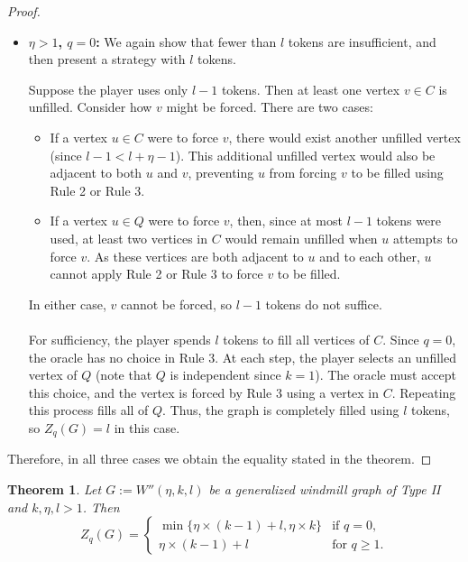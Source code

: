 \documentclass[11pt]{article}
\theoremstyle{plain}
\newtheorem{theorem}{Theorem}[section]
\theoremstyle{definition}
\theoremstyle{remark}
\begin{document}
\begin{proof}
\begin{itemize}
    \item \textbf{$\eta > 1$, $q = 0$:}  
    We again show that fewer than $l$ tokens are insufficient, and then present a strategy with $l$ tokens.  

    Suppose the player uses only $l-1$ tokens. Then at least one vertex $v \in C$ is unfilled. Consider how $v$ might be forced. There are two cases:

    \begin{itemize}
        
        \item If a vertex $u \in C$ were to force $v$, there would exist another unfilled vertex (since $l-1 < l+\eta-1$). This additional unfilled vertex would also be adjacent to both $u$ and $v$, preventing $u$ from forcing $v$ to be filled using Rule 2 or Rule 3.\\  
    
        \item If a vertex $u \in Q$ were to force $v$, then, since at most $l-1$ tokens were used, at least two vertices in $C$ would remain unfilled when $u$ attempts to force $v$. As these vertices are both adjacent to $u$ and to each other, $u$ cannot apply Rule 2 or Rule 3 to force $v$ to be filled.
    \end{itemize}
    In either case, $v$ cannot be forced, so $l-1$ tokens do not suffice.\\\\   
    For sufficiency, the player spends $l$ tokens to fill all vertices of $C$. Since $q=0$, the oracle has no choice in Rule 3. At each step, the player selects an unfilled vertex of $Q$ (note that $Q$ is independent since $k=1$). The oracle must accept this choice, and the vertex is forced by Rule 3 using a vertex in $C$. Repeating this process fills all of $Q$. Thus, the graph is completely filled using $l$ tokens, so $Z_q(G) = l$ in this case.
\end{itemize}

Therefore, in all three cases we obtain the equality stated in the theorem.
\end{proof}



\begin{theorem}
    Let $G := W''(\eta,k,l)$ be a generalized windmill graph of Type II and $k, \eta, l>1$. Then
    $$Z_q(G) = 
    \begin{cases}
        \min \{\eta \times (k-1) + l , \eta \times k\} & \text{if } q = 0, \\
        \eta \times (k-1) + l & \text{for } q \geq 1.
    \end{cases}$$
\end{theorem}
\end{document}
